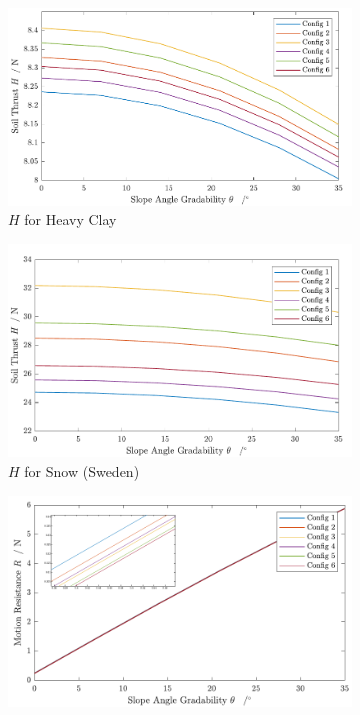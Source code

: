 \begin{figure}[htb]
     \centering
     \begin{subfigure}[b]{0.49\textwidth}
         \centering
         \includegraphics[width=\textwidth]{Media/Soil Thrust Heavy Clay.pdf}
         \caption{\(H\) for Heavy Clay}
         \label{fig:HClay}
     \end{subfigure}
     \hfill
     \begin{subfigure}[b]{0.49\textwidth}
         \centering
         \includegraphics[width=\textwidth]{Media/Soil Thrust Snow.pdf}
         \caption{\(H\) for Snow (Sweden)}
         \label{fig:HSnow}
     \end{subfigure}
     \hfill
     \begin{subfigure}[b]{0.49\textwidth}
         \centering
         \includegraphics[width=\textwidth]{Media/ResistanceHeavyClay.pdf}

\end{subfigure}
\end{figure}

